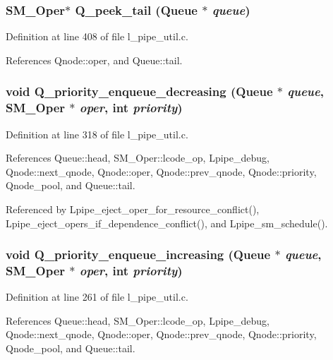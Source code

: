 \subsubsection{\setlength{\rightskip}{0pt plus 5cm}\bf{SM\_\-Oper}$\ast$ Q\_\-peek\_\-tail (\bf{Queue} $\ast$ {\em queue})}\label{l__pipe__util_8c_97fa4ed0e8f32c08ef93c041c69c542d}




Definition at line 408 of file l\_\-pipe\_\-util.c.

References Qnode::oper, and Queue::tail.
\subsubsection{\setlength{\rightskip}{0pt plus 5cm}void Q\_\-priority\_\-enqueue\_\-decreasing (\bf{Queue} $\ast$ {\em queue}, \bf{SM\_\-Oper} $\ast$ {\em oper}, int {\em priority})}\label{l__pipe__util_8c_8fcbbb02452d1ca7f1fb27f24bf23fc9}




Definition at line 318 of file l\_\-pipe\_\-util.c.

References Queue::head, SM\_\-Oper::lcode\_\-op, Lpipe\_\-debug, Qnode::next\_\-qnode, Qnode::oper, Qnode::prev\_\-qnode, Qnode::priority, Qnode\_\-pool, and Queue::tail.

Referenced by Lpipe\_\-eject\_\-oper\_\-for\_\-resource\_\-conflict(), Lpipe\_\-eject\_\-opers\_\-if\_\-dependence\_\-conflict(), and Lpipe\_\-sm\_\-schedule().
\subsubsection{\setlength{\rightskip}{0pt plus 5cm}void Q\_\-priority\_\-enqueue\_\-increasing (\bf{Queue} $\ast$ {\em queue}, \bf{SM\_\-Oper} $\ast$ {\em oper}, int {\em priority})}\label{l__pipe__util_8c_5d0d8ff30543d84c18044af612092e86}




Definition at line 261 of file l\_\-pipe\_\-util.c.

References Queue::head, SM\_\-Oper::lcode\_\-op, Lpipe\_\-debug, Qnode::next\_\-qnode, Qnode::oper, Qnode::prev\_\-qnode, Qnode::priority, Qnode\_\-pool, and Queue::tail.

